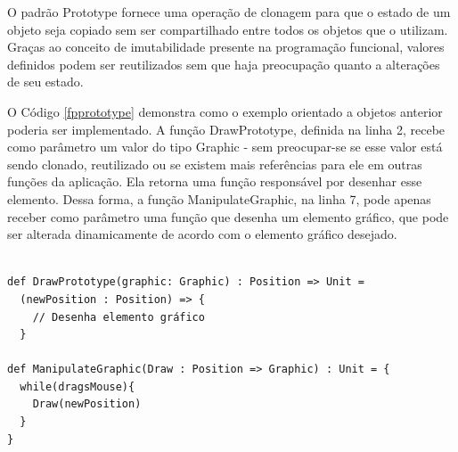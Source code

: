 O padrão Prototype fornece uma operação de 
clonagem para que o estado de um objeto seja 
copiado sem ser compartilhado entre todos 
os objetos que o utilizam. Graças ao conceito 
de imutabilidade presente na programação 
funcional, valores definidos podem 
ser reutilizados sem que haja preocupação 
quanto a alterações de seu estado.

O Código \ref{fpprototype} demonstra como o 
exemplo orientado a objetos anterior poderia 
ser implementado. A função DrawPrototype, 
definida na linha 2, recebe como parâmetro um 
valor do tipo Graphic - sem preocupar-se se 
esse valor está sendo clonado, reutilizado ou 
se existem mais referências para ele em outras 
funções da aplicação. Ela retorna uma função 
responsável por desenhar esse elemento. Dessa 
forma, a função ManipulateGraphic, na linha 
7, pode apenas receber como parâmetro uma função 
que desenha um elemento gráfico, que pode ser 
alterada dinamicamente de acordo com o elemento 
gráfico desejado.

\begin{lstlisting}[caption={Prototype Funcional.},label=fpprototype]
    
def DrawPrototype(graphic: Graphic) : Position => Unit =
  (newPosition : Position) => {
    // Desenha elemento gráfico
  }

def ManipulateGraphic(Draw : Position => Graphic) : Unit = {
  while(dragsMouse){
    Draw(newPosition)
  }
}
    
\end{lstlisting}